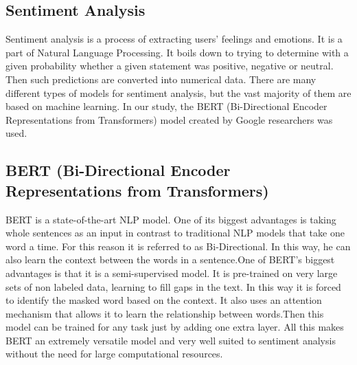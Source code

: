 \documentclass[11pt]{article} %
\begin{document}
\subsection{Sentiment Analysis}
Sentiment analysis is a process of extracting users' feelings and emotions. It is a part of Natural Language Processing. It boils down to trying to determine with a given probability whether a given statement was positive, negative or neutral. Then such predictions are converted into numerical data. There are many different types of models for sentiment analysis, but the vast majority of them are based on machine learning. In our study, the BERT (Bi-Directional Encoder Representations from Transformers) model created by Google researchers was used. 

\subsection{BERT (Bi-Directional Encoder Representations from Transformers)}
BERT is a state-of-the-art NLP model. One of its biggest advantages is taking whole sentences as an input in contrast to traditional NLP models that take one word a time. For this reason it is referred to as Bi-Directional. In this way, he can also learn the context between the words in a sentence.One of BERT's biggest advantages is that it is a semi-supervised model. It is pre-trained on very large sets of non labeled data, learning to fill gaps in the text. In this way it is forced to identify the masked word based on the context. It also uses an attention mechanism that allows it to learn the relationship between words.Then this model can be trained for any task just by adding one extra layer.  All this makes BERT an extremely versatile model and very well suited to sentiment analysis without the need for large computational resources. 
\end{document}
